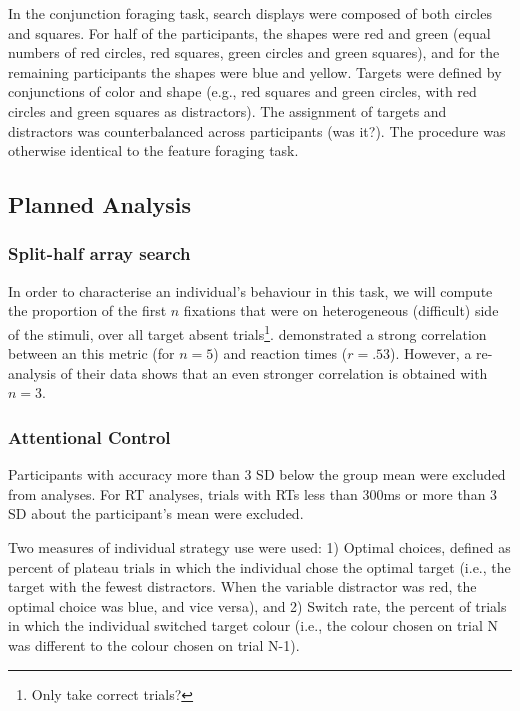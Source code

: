 \documentclass[]{rsos}%
\begin{document}
In the conjunction foraging task, search displays were composed of both circles and squares. For half of the participants, the shapes were red and green (equal numbers of red circles, red squares, green circles and green squares), and for the remaining participants the shapes were blue and yellow. Targets were defined by conjunctions of color and shape (e.g., red squares and green circles, with red circles and green squares as distractors). The assignment of targets and distractors was counterbalanced across participants (was it?). The procedure was otherwise identical to the feature foraging task. 

\subsection{Planned Analysis}

\subsubsection{Split-half array search}

In order to characterise an individual's behaviour in this task, we will compute the proportion of the first $n$ fixations that were on heterogeneous (difficult) side of the stimuli, over all target absent trials\footnote{Only take correct trials?}. \cite{nowakowsak2017} demonstrated a strong correlation between an this metric (for $n=5$) and reaction times ($r=.53$). However, a re-analysis of their data shows that an even stronger correlation is obtained with $n=3$.

\subsubsection{Attentional Control}

Participants with accuracy more than 3 SD below the group mean were excluded from analyses. For RT analyses, trials with RTs less than 300ms or more than 3 SD about the participant’s mean were excluded. 

Two measures of individual strategy use were used: 1) Optimal choices, defined as percent of plateau trials in which the individual chose the optimal target (i.e., the target with the fewest distractors. When the variable distractor was red, the optimal choice was blue, and vice versa), and 2) Switch rate, the percent of trials in which the individual switched target colour (i.e., the colour chosen on trial N was different to the colour chosen on trial N-1).  
\end{document}
